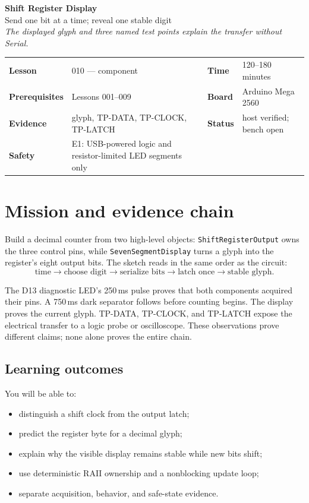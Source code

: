 \documentclass[11pt]{article}
\begin{document}
\begin{center}
  {\Huge\bfseries Shift Register Display}\\[4pt]
  {\Large Send one bit at a time; reveal one stable digit}\\[8pt]
  \textit{The displayed glyph and three named test points explain the transfer without Serial.}
\end{center}

\begin{tabularx}{\linewidth}{@{}>{\bfseries}l X >{\bfseries}l X@{}}
Lesson & 010 --- component & Time & 120--180 minutes\\
Prerequisites & Lessons 001--009 & Board & Arduino Mega 2560\\
Evidence & glyph, TP-DATA, TP-CLOCK, TP-LATCH & Status & host verified; bench open\\
Safety & E1: USB-powered logic and resistor-limited LED segments only\\
\end{tabularx}

\section{Mission and evidence chain}

Build a decimal counter from two high-level objects:
\texttt{ShiftRegisterOutput} owns the three control pins, while
\texttt{SevenSegmentDisplay} turns a glyph into the register's eight output
bits. The sketch reads in the same order as the circuit:
\[
\text{time}\rightarrow\text{choose digit}\rightarrow
\text{serialize bits}\rightarrow\text{latch once}\rightarrow\text{stable glyph}.
\]

The D13 diagnostic LED's 250\,ms pulse proves that both components acquired
their pins. A 750\,ms dark separator follows before counting begins. The
display proves the current glyph. TP-DATA, TP-CLOCK, and TP-LATCH expose the
electrical transfer to a logic probe or oscilloscope. These observations prove
different claims; none alone proves the entire chain.

\subsection{Learning outcomes}

You will be able to:
\begin{itemize}
  \item distinguish a shift clock from the output latch;
  \item predict the register byte for a decimal glyph;
  \item explain why the visible display remains stable while new bits shift;
  \item use deterministic RAII ownership and a nonblocking update loop;
  \item separate acquisition, behavior, and safe-state evidence.
\end{itemize}
\end{document}
